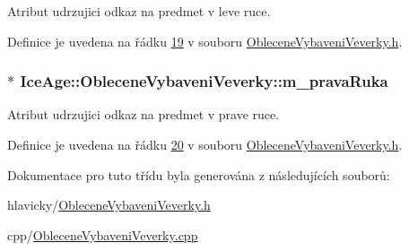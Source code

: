 Atribut udrzujici odkaz na predmet v leve ruce. 



Definice je uvedena na řádku \hyperlink{ObleceneVybaveniVeverky_8h_source_l00019}{19} v souboru \hyperlink{ObleceneVybaveniVeverky_8h_source}{Oblecene\+Vybaveni\+Veverky.\+h}.

\subsubsection[{\texorpdfstring{m\+\_\+prava\+Ruka}{m_pravaRuka}}]{$\ast$ Ice\+Age\+::\+Oblecene\+Vybaveni\+Veverky\+::m\+\_\+prava\+Ruka\hspace{0.3cm}{\ttfamily [protected]}}\hypertarget{classIceAge_1_1ObleceneVybaveniVeverky_a5cbec76ba9606fa634019e10f33f605c}{}\label{classIceAge_1_1ObleceneVybaveniVeverky_a5cbec76ba9606fa634019e10f33f605c}


Atribut udrzujici odkaz na predmet v prave ruce. 



Definice je uvedena na řádku \hyperlink{ObleceneVybaveniVeverky_8h_source_l00020}{20} v souboru \hyperlink{ObleceneVybaveniVeverky_8h_source}{Oblecene\+Vybaveni\+Veverky.\+h}.



Dokumentace pro tuto třídu byla generována z následujících souborů\+:\begin{DoxyCompactItemize}
\item 
hlavicky/\hyperlink{ObleceneVybaveniVeverky_8h}{Oblecene\+Vybaveni\+Veverky.\+h}\item 
cpp/\hyperlink{ObleceneVybaveniVeverky_8cpp}{Oblecene\+Vybaveni\+Veverky.\+cpp}\end{DoxyCompactItemize}
